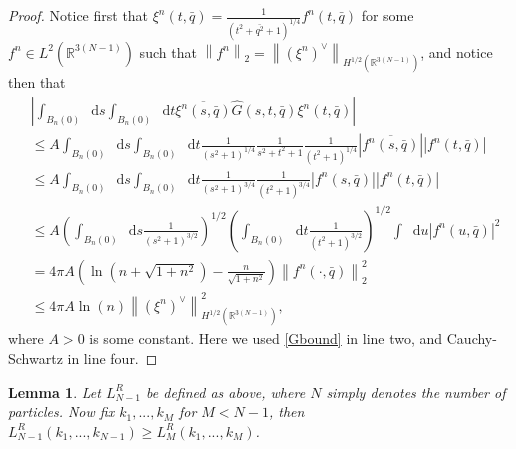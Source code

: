 \documentclass[a4paper,11pt]{article}
\newcommand{\norm}[1]{\left\lVert #1 \right\rVert}
\newcommand{\abs}[1]{\left\lvert #1 \right\rvert}
\newcommand*\diff{\mathop{}\!\mathrm{d}}
\newcommand{\R}{\mathbb{R}}
\newtheorem{lemma}{Lemma}
\numberwithin{equation}{section}
\begin{document}
	\begin{proof}
		Notice first that $ \xi^n(t,\bar{q})=\frac{1}{(t^2+\bar{q^2}+1)^{1/4}}f^n(t,\bar{q}) $ for some $ f^n\in L^2(\R^{3(N-1)}) $ such that $ \norm{f^n}_2=\norm{(\xi^n)^\vee}_{H^{1/2}(\R^{3(N-1)})} $, and notice then that 
		\begin{equation}
		\begin{aligned}
		&\abs{\int_{ B_n(0)}\diff s\int_{B_n(0)}\diff t \overline{\xi^n(s,\bar{q})}\hat{G}(s,t,\bar{q})\xi^n(t,\bar{q})}\\&\leq A \int_{B_n(0)}\diff s\int_{B_n(0)}\diff t \frac{1}{(s^2+1)^{1/4}}\frac{1}{s^2+t^2+1}\frac{1}{(t^2+1)^{1/4}} \abs{\overline{f^n(s,\bar{q})}}\abs{f^n(t,\bar{q})}\\&
		\leq A \int_{B_n(0)}\diff s\int_{B_n(0)}\diff t \frac{1}{(s^2+1)^{3/4}}\frac{1}{(t^2+1)^{3/4}} \abs{f^n(s,\bar{q})}\abs{f^n(t,\bar{q})}\\&
		\leq A \left(\int_{B_n(0)}\diff s \frac{1}{(s^2+1)^{3/2}}\right)^{1/2}\left(\int_{B_n(0)}\diff t \frac{1}{(t^2+1)^{3/2}} \right)^{1/2}\int \diff u \abs{f^n(u,\bar{q})}^2\\
		&= 4\pi A \left(\ln\left(n+\sqrt{1+n^2}\right)-\frac{n}{\sqrt{1+n^2}}\right)\norm{f^n(\cdot,\bar{q})}_2^2\\
		&\leq 4\pi A \ln(n)\norm{(\xi^n)^\vee}^2_{H^{1/2}(\R^{3(N-1)})} ,
		\end{aligned}
		\end{equation}
		where $ A>0 $ is some constant. Here we used \eqref{Gbound} in line two, and Cauchy-Schwartz in line four.
	\end{proof}
	\begin{lemma}
		Let $ L^R_{N-1} $ be defined as above, where $ N $ simply denotes the number of particles. Now fix $ k_1,...,k_M $ for $ M<N-1 $, then $ L_{N-1}^R(k_1,...,k_{N-1})\geq L_{M}^R(k_1,...,k_M) $.
	\end{lemma}
\end{document}

